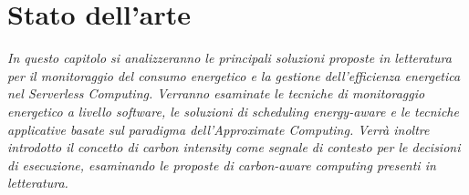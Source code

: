 \chapter{Stato dell’arte}
\label{cap:Stato dell'arte}
\textit{In questo capitolo si analizzeranno le principali 
soluzioni proposte in letteratura per il monitoraggio del 
consumo energetico e la gestione dell'efficienza energetica 
nel Serverless Computing. Verranno esaminate le tecniche 
di monitoraggio energetico a livello software, 
le soluzioni di scheduling energy-aware e le tecniche 
applicative basate sul paradigma dell'Approximate Computing. 
Verrà inoltre introdotto il concetto di carbon intensity 
come segnale di contesto per le decisioni di esecuzione, 
esaminando le proposte di carbon-aware computing presenti 
in letteratura.}



